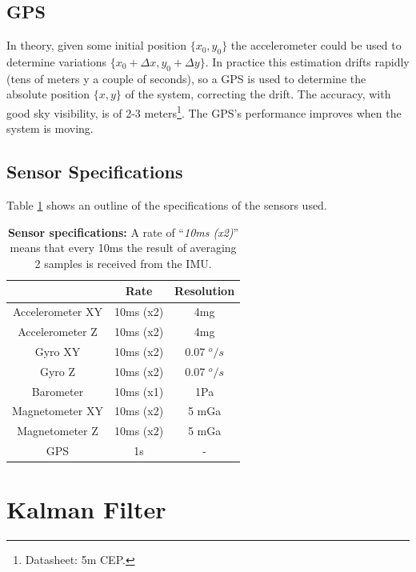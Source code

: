 \documentclass[conference]{IEEEtran}
\begin{document}
\subsection{GPS}
\label{sec:sensors-gps}

In theory, given some initial position $\{x_0 ,y_0\}$ the accelerometer could be used to determine variations $\{x_0+\Delta x,y_0+\Delta y\}$. In practice this estimation drifts rapidly (tens of meters y a couple of seconds), so a GPS is used to determine the absolute position $\{x,y\}$ of the system, correcting the drift. The accuracy, with good sky visibility, is of 2-3 meters\footnote{Datasheet: 5m CEP.}. The GPS's performance improves when the system is moving.

\subsection{Sensor Specifications}
\label{sec:sensors-specifications}

Table \ref{tab:sensors:resumen} shows an outline of the specifications of the sensors used.

\begin{table}[h]
\begin{center}
\begin{tabular}{|c|c|c|}
\hline
 & Rate & Resolution \\
\hline
Accelerometer XY & 10ms (x2)& 4mg\\
\hline
Accelerometer Z  & 10ms (x2)& 4mg\\
\hline
Gyro XY  & 10ms (x2)& 0.07 $^o/s$\\
\hline
Gyro Z  & 10ms (x2)& 0.07 $^o/s$\\
\hline
Barometer  & 10ms (x1) & 1Pa\\
\hline
Magnetometer XY  & 10ms  (x2)& 5 mGa\\
\hline
Magnetometer Z  & 10ms (x2)& 5 mGa\\
\hline
GPS  & 1s & - \\
\hline
\end{tabular}
\end{center}
\caption{\textbf{Sensor specifications:} A rate of ``\textit{10ms (x2)}'' means that every 10ms the result of averaging 2 samples is received from the IMU.}
\label{tab:sensors:resumen}
\end{table}

\section{Kalman Filter}
\end{document}

